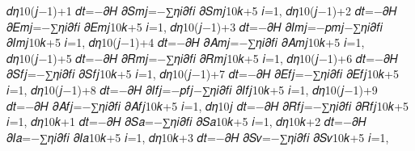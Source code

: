 𝑑𝜂10(𝑗−1)+1
𝑑𝑡=−𝜕𝐻
𝜕𝑆𝑚𝑗=−∑𝜂𝑖𝜕𝑓𝑖
𝜕𝑆𝑚𝑗10𝑘+5
𝑖=1,
𝑑𝜂10(𝑗−1)+2
𝑑𝑡=−𝜕𝐻
𝜕𝐸𝑚𝑗=−∑𝜂𝑖𝜕𝑓𝑖
𝜕𝐸𝑚𝑗10𝑘+5
𝑖=1,
𝑑𝜂10(𝑗−1)+3
𝑑𝑡=−𝜕𝐻
𝜕𝐼𝑚𝑗=−𝑝𝑚𝑗−∑𝜂𝑖𝜕𝑓𝑖
𝜕𝐼𝑚𝑗10𝑘+5
𝑖=1,
𝑑𝜂10(𝑗−1)+4
𝑑𝑡=−𝜕𝐻
𝜕𝐴𝑚𝑗=−∑𝜂𝑖𝜕𝑓𝑖
𝜕𝐴𝑚𝑗10𝑘+5
𝑖=1,
𝑑𝜂10(𝑗−1)+5
𝑑𝑡=−𝜕𝐻
𝜕𝑅𝑚𝑗=−∑𝜂𝑖𝜕𝑓𝑖
𝜕𝑅𝑚𝑗10𝑘+5
𝑖=1,
𝑑𝜂10(𝑗−1)+6
𝑑𝑡=−𝜕𝐻
𝜕𝑆𝑓𝑗=−∑𝜂𝑖𝜕𝑓𝑖
𝜕𝑆𝑓𝑗10𝑘+5
𝑖=1,
𝑑𝜂10(𝑗−1)+7
𝑑𝑡=−𝜕𝐻
𝜕𝐸𝑓𝑗=−∑𝜂𝑖𝜕𝑓𝑖
𝜕𝐸𝑓𝑗10𝑘+5
𝑖=1,
𝑑𝜂10(𝑗−1)+8
𝑑𝑡=−𝜕𝐻
𝜕𝐼𝑓𝑗=−𝑝𝑓𝑗−∑𝜂𝑖𝜕𝑓𝑖
𝜕𝐼𝑓𝑗10𝑘+5
𝑖=1,
𝑑𝜂10(𝑗−1)+9
𝑑𝑡=−𝜕𝐻
𝜕𝐴𝑓𝑗=−∑𝜂𝑖𝜕𝑓𝑖
𝜕𝐴𝑓𝑗10𝑘+5
𝑖=1,
𝑑𝜂10𝑗
𝑑𝑡=−𝜕𝐻
𝜕𝑅𝑓𝑗=−∑𝜂𝑖𝜕𝑓𝑖
𝜕𝑅𝑓𝑗10𝑘+5
𝑖=1,
𝑑𝜂10𝑘+1
𝑑𝑡=−𝜕𝐻
𝜕𝑆𝑎=−∑𝜂𝑖𝜕𝑓𝑖
𝜕𝑆𝑎10𝑘+5
𝑖=1,
𝑑𝜂10𝑘+2
𝑑𝑡=−𝜕𝐻
𝜕𝐼𝑎=−∑𝜂𝑖𝜕𝑓𝑖
𝜕𝐼𝑎10𝑘+5
𝑖=1,
𝑑𝜂10𝑘+3
𝑑𝑡=−𝜕𝐻
𝜕𝑆𝑣=−∑𝜂𝑖𝜕𝑓𝑖
𝜕𝑆𝑣10𝑘+5
𝑖=1,